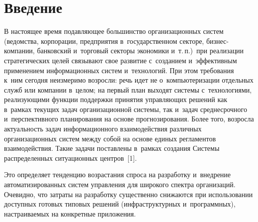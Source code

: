   
\vspace*{6pt}



\thispagestyle{headings}

\begin{multicols}{2}

\label{st\stat}


\section{Введение}

    В настоящее время подавляющее большинство организационных сис\-тем 
(ведомства, корпорации, предприятия в~государственном секторе, 
биз\-нес-ком\-па\-нии, банковский и~торговый секторы экономики и~т.\,п.)\ при реализации 
стратегических целей связывают свое развитие с~созданием и~эффективным 
применением информационных систем и~технологий.  При этом требования 
к~ним сегодня неизмеримо возросли: речь идет не о~компьютеризации\linebreak 
отдельных служб или компании в~целом; на первый план выходят системы 
с~технологиями, реа\-ли\-зу\-ющи\-ми функции поддержки принятия 
управ\-ля\-ющих решений как в~рамках текущих задач организаци\-он\-ной 
системы, так и~задач среднесрочного и~перспективного планирования на 
основе прогнозирования. Более того, возросла актуальность задач 
информационного взаимодействия различных организационных сис\-тем 
между собой на основе единых регламентов взаимодействия. Такие задачи 
поставлены в~рамках  создания Сис\-те\-мы распределенных ситуационных 
центров~[1].  
    
    Это определяет тенденцию возрастания спроса на разработку 
и~внедрение автоматизированных систем управления для широкого спектра 
организаций. Очевидно, что затраты на разработку существенно снижаются 
при использовании доступных готовых типовых решений 
(инфраструктурных и~программных), настраиваемых на конкретные 
приложения.

\begin{figure*}[b] %
\vspace*{11pt}
 \begin{center}
 \mbox{%
 \epsfxsize=156.428mm 
 }
 \end{center}
\vspace*{-9pt}
\end{figure*}
    

\end{multicols}
